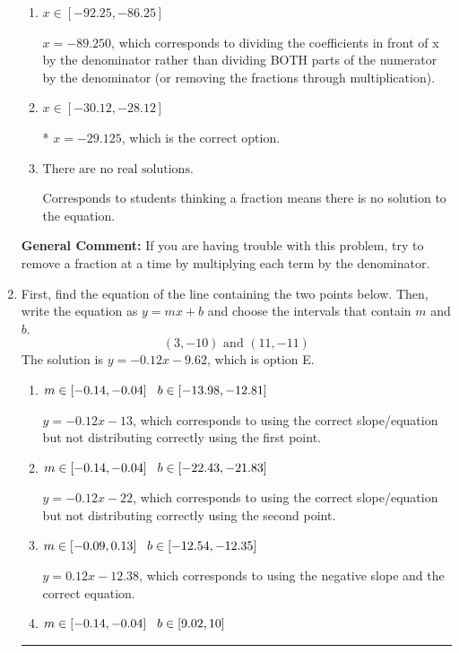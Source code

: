 \documentclass{extbook}[14pt]
\newcommand{\litem}[1]{\item #1

\rule{\textwidth}{0.4pt}}
\begin{document}
\begin{enumerate}
{\begin{enumerate}[label=\Alph*.]
 $x = 0.793$, which corresponds to dividing the second number in the numerator by the denominator rather than dividing BOTH parts of the numerator by the denominator (or removing the fractions through multiplication).
\item \( x \in [-92.25, -86.25] \)

 $x = -89.250$, which corresponds to dividing the coefficients in front of x by the denominator rather than dividing BOTH parts of the numerator by the denominator (or removing the fractions through multiplication).
\item \( x \in [-30.12, -28.12] \)

* $x = -29.125$, which is the correct option.
\item \( \text{There are no real solutions.} \)

Corresponds to students thinking a fraction means there is no solution to the equation.
\end{enumerate}

\textbf{General Comment:} If you are having trouble with this problem, try to remove a fraction at a time by multiplying each term by the denominator.
}
\litem{
First, find the equation of the line containing the two points below. Then, write the equation as $ y=mx+b $ and choose the intervals that contain $m$ and $b$.
\[ (3, -10) \text{ and } (11, -11) \]The solution is \( y = -0.12x -9.62 \), which is option E.\begin{enumerate}[label=\Alph*.]
\item \( m \in [-0.14, -0.04] \hspace*{3mm} b \in [-13.98, -12.81] \)

 $y = -0.12x -13$, which corresponds to using the correct slope/equation but not distributing correctly using the first point.
\item \( m \in [-0.14, -0.04] \hspace*{3mm} b \in [-22.43, -21.83] \)

 $y = -0.12x -22$, which corresponds to using the correct slope/equation but not distributing correctly using the second point.
\item \( m \in [-0.09, 0.13] \hspace*{3mm} b \in [-12.54, -12.35] \)

 $y = 0.12x -12.38$, which corresponds to using the negative slope and the correct equation.
\item \( m \in [-0.14, -0.04] \hspace*{3mm} b \in [9.02, 10] \)


\end{enumerate}}
\end{enumerate}
\end{document}
